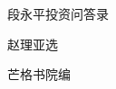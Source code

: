 \thispagestyle{empty}
\vspace*{3em}
\begin{center}
  {\xbsong{}段永平投资问答录\par}
  \vspace{4em}
  {\kaishu 赵理亚\q 选\par}
  \vspace{0.8em}
  {\kaishu 芒格书院\q 编\par}
\end{center}
\cleardoublepage
